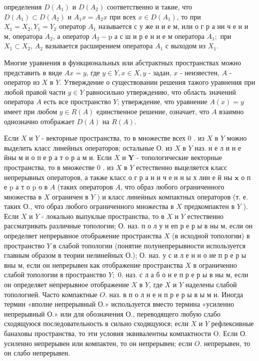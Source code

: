 \documentclass[10pt]{article}
\begin{document}
определения $D\left(A_{1}\right)$ и $D\left(A_{2}\right)$ соответственно и такие, что $D\left(A_{1}\right) \subset D\left(A_{2}\right)$ и $A_{1} x=A_{2} x$ при всех $x \in D\left(A_{1}\right)$, то при $X_{1}=X_{2}, Y_{1}=Y_{2}$ оператор $A_{1}$ называется с у же н и е м, или о г р а ни ч е н и м, оператора $A_{2}$, а оператор $A_{2}-\mathrm{p}$ а с ш и р е н и е м оператора $A_{1} ;$ при $X_{1} \subset X_{2}$, $A_{2}$ вазывается расширением оператора $A_{1}$ с выходом из $X_{1}$.



Многие уравнения в функциональных или абстрактных пространствах можно представить в виде $A x=y$, где $y \in Y, x \in X, y$ - задан, $x$ - неизвестен, $A$ - оператор из $X$ в $Y$. Утверждение о существовании решения тажого уравнения при любой правой части $y \in Y$ равносильно утверждению, что область значений оператора $A$ есть все пространство $Y$; утверждение, что уравнение $A(x)=y$ имеет при любом $y \in R(A)$ единственное решение, означает, что $\dot{A}$ взаимно однозначно отображает $D(A)$ на $R(A)$.



Если $X$ и $Y$ - векторные пространства, то в множестве всех 0 . из $X$ в $Y$ можно выделить класс линейных операторов; остальные О. из $X$ в $Y$ наз. н е л и н е йны м и о п е р а т о р а м и. Если $X$ и $\boldsymbol{Y}$ - топологические векторные пространства, то в множестве 0 . из $X$ в $Y$ естественно выцеляется класс непрерывных операторов, а также класс о г р а н и ч е н н ы х лин е й ны $\mathbf{x}$ о п е $\mathrm{p}$ а т о $\mathrm{p}$ о в $A$ (таких операторов $A$, что образ любого ограниченного множества в $X$ ограничен в $Y$ ) и класс линеӥных компактных операторов (т. е. таких О., что образ любого ограниченного множества в $X$ предкомпактен в $Y$ ). Если $X$ и $Y$ - локально выпуклые пространства, то в $X$ и $Y$ естественно рассматривать различные топологии; О. наз. п о л у н еп р е р ы в ны м, если он определяет непрерывное отображение пространства $X$ (в исходной топологии) в пространство $Y$ в слабой топологии (понятие полунепрерывности используется главным образом в теории нелинейных О.); О. наз. у с и л е н н о не п р е р ы вны м, если он непрерывен как отображение пространства $X$ в ограниченно слабой топологии в пространство $Y ;$ 0. наз. с л а б о н е п р е р ы в ны м, если он определяет непрерывное отображение $X$ в $Y$, где $X$ и $Y$ наделены слабой топологией. Часто компактные $O$. наз. в п о л н е н п р е р ы в ы м и. Иногда термин «вполне непрерывный $О$.» используется вместо термина «усиленно непрерывный О.» или для обозначения О., переводящего любую слабо сходящуюся последовательность в сильно сходящуюся; если $X$ и $Y$ рефлексивные банаховы пространства, то эти условия эквивалентны компактности $\mathrm{O}$. Если О. усиленно непрерывен или компактен, то он непрерывен; если $O$. непрерывен, то он слабо непрерывен.
\end{document}
